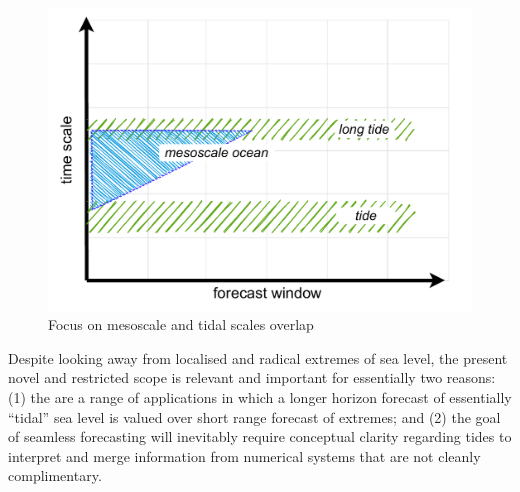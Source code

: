 \begin{figure}[H]\centering
  \includegraphics[width=\figwidthBig]{figures/diagrams/scales_focus.pdf}
  \caption{Focus on mesoscale and tidal scales overlap}
  \label{fig:forecastScalesFocus}
\end{figure}

Despite looking away from localised and radical extremes of sea level, the present novel and restricted scope is relevant and important for essentially two  reasons: (1) the are a range of applications in which a longer horizon forecast of essentially ``tidal'' sea level is valued over short range forecast of extremes; and (2) the goal of seamless forecasting will inevitably require conceptual clarity regarding tides to interpret and merge information from numerical systems that are not cleanly complimentary. 


